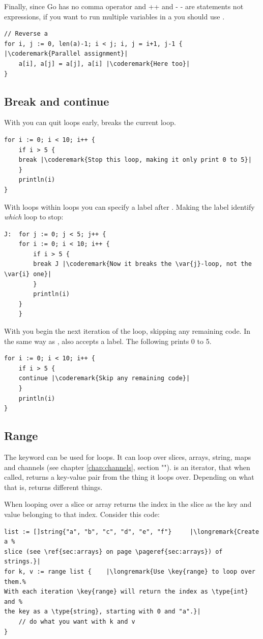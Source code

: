 Finally, since Go has no comma operator and ++ and - - are statements not
expressions, if you want to run multiple variables in a  you should
use .
\begin{lstlisting}
// Reverse a
for i, j := 0, len(a)-1; i < j; i, j = i+1, j-1 { |\coderemark{Parallel assignment}|
    a[i], a[j] = a[j], a[i] |\coderemark{Here too}|
}
\end{lstlisting}

\subsection{Break and continue}
With  you can quit loops early,  breaks
the current loop.
\begin{lstlisting}
for i := 0; i < 10; i++ {
    if i > 5 {
	break |\coderemark{Stop this loop, making it only print 0 to 5}|
    }
    println(i)
}
\end{lstlisting}
With loops within loops you can specify a label after .
Making the label identify \emph{which} loop to stop:
\begin{lstlisting}
J:  for j := 0; j < 5; j++ {
	for i := 0; i < 10; i++ {
	    if i > 5 { 
		break J	|\coderemark{Now it breaks the \var{j}-loop, not the \var{i} one}|
	    }
	    println(i)
	}
    } 
\end{lstlisting}

With  you begin the next iteration of the
loop, skipping any remaining code. In the same way as ,
 also accepts a label. The following prints 0 to 5.
\begin{lstlisting}
for i := 0; i < 10; i++ {
    if i > 5 {
	continue |\coderemark{Skip any remaining code}|
    }
    println(i)
}
\end{lstlisting}

\subsection{Range}
The keyword  can be used for loops. It
can loop over slices, arrays, string, maps and channels (see chapter
\ref{chap:channels}, section "").  is
an iterator, that when called, returns a key-value pair from the thing it
loops over. Depending on what that is,  returns
different things.

When looping over a slice or array  returns the index in the
slice as the key and value belonging to that index.
Consider this code: 
\begin{lstlisting}
list := []string{"a", "b", "c", "d", "e", "f"}     |\longremark{Create a %
slice (see \ref{sec:arrays} on page \pageref{sec:arrays}) of strings.}|
for k, v := range list {	|\longremark{Use \key{range} to loop over them.%
With each iteration \key{range} will return the index as \type{int} and %
the key as a \type{string}, starting with 0 and "a".}|
    // do what you want with k and v
}
\end{lstlisting}
\showremarks

